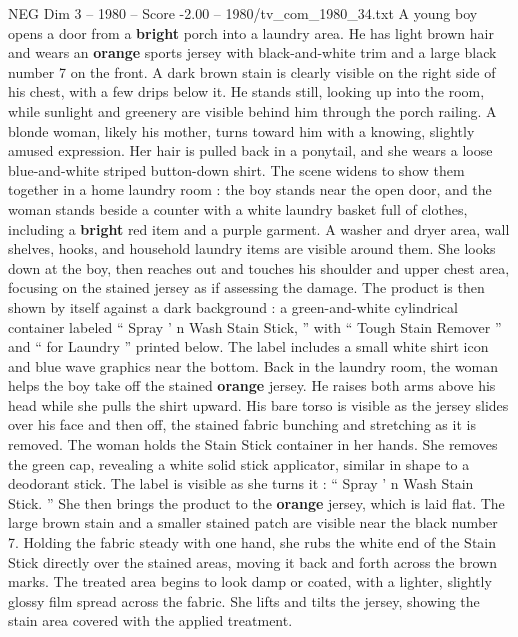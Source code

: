 \begin{textsample}{NEG Dim 3 – 1980 – Score -2.00 – 1980/tv\_com\_1980\_34.txt}  \label{ex:f3_neg_053}
A young boy opens a door from a \textbf{bright} porch into a laundry area.
He has light brown hair and wears an \textbf{orange} sports jersey with black-and-white trim and a large black number 7 on the front.
A dark brown stain is clearly visible on the right side of his chest, with a few drips below it.
He stands still, looking up into the room, while sunlight and greenery are visible behind him through the porch railing.
A blonde woman, likely his mother, turns toward him with a knowing, slightly amused expression.
Her hair is pulled back in a ponytail, and she wears a loose blue-and-white striped button-down shirt.
The scene widens to show them together in a home laundry room : the boy stands near the open door, and the woman stands beside a counter with a white laundry basket full of clothes, including a \textbf{bright} red item and a purple garment.
A washer and dryer area, wall shelves, hooks, and household laundry items are visible around them.
She looks down at the boy, then reaches out and touches his shoulder and upper chest area, focusing on the stained jersey as if assessing the damage.
The product is then shown by itself against a dark background : a green-and-white cylindrical container labeled “ Spray ’ n Wash Stain Stick, ” with “ Tough Stain Remover ” and “ for Laundry ” printed below.
The label includes a small white shirt icon and blue wave graphics near the bottom.
Back in the laundry room, the woman helps the boy take off the stained \textbf{orange} jersey.
He raises both arms above his head while she pulls the shirt upward.
His bare torso is visible as the jersey slides over his face and then off, the stained fabric bunching and stretching as it is removed.
The woman holds the Stain Stick container in her hands.
She removes the green cap, revealing a white solid stick applicator, similar in shape to a deodorant stick.
The label is visible as she turns it : “ Spray ’ n Wash Stain Stick. ” She then brings the product to the \textbf{orange} jersey, which is laid flat.
The large brown stain and a smaller stained patch are visible near the black number 7.
Holding the fabric steady with one hand, she rubs the white end of the Stain Stick directly over the stained areas, moving it back and forth across the brown marks.
The treated area begins to look damp or coated, with a lighter, slightly glossy film spread across the fabric.
She lifts and tilts the jersey, showing the stain area covered with the applied treatment.

\end{textsample}
